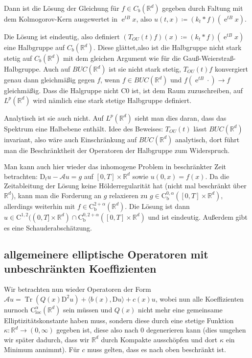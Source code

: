 \documentclass[11pt,a4paper]{scrartcl}
\newcommand{\R}{\mathbb{R}} %
\newcommand{\A}{\mathcal{A}}
\newcommand{\Cb}{\mathrm{C}_\mathrm{b}}
\theoremstyle{plain}
\theoremstyle{definition}
\theoremstyle{remark}
\DeclareMathOperator{\Tr}{Tr}
\DeclareMathOperator{\e}{e}
\begin{document}
Dann ist die Lösung der Gleichung für $f\in C_b(\R^d)$ gegeben durch Faltung mit dem Kolmogorov-Kern ausgewertet in $\e^{tB}x$, also $u(t,x)\coloneqq (k_t\ast f)(\e^{tB}x)$.

Die Lösung ist eindeutig, also definiert $(T_{OU}(t)f)(x)\coloneqq (k_t\ast f)(\e^{tB}x)$ eine Halbgruppe auf $C_b(\R^d)$. Diese glättet,also ist die Halbgruppe nicht stark stetig auf $C_b(\R^d)$ mit dem gleichen Argument wie für die Gauß-Weierstraß-Halbgruppe. Auch auf $BUC(\R^d)$ ist sie nicht stark stetig, $T_{OU}(t)f$ konvergiert genau dann gleichmäßig gegen $f$, wenn $f\in BUC(\R^d)$ und $f(\e^{tB}\cdot)\to f$ gleichmäßig. Dass die Halgruppe nicht C0 ist, ist dem Raum zuzuschreiben, auf $L^p(\R^d)$ wird nämlich eine stark stetige Halbgruppe definiert.

Analytisch ist sie auch nicht. Auf $L^p(\R^d)$ sieht man dies daran, dass das Spektrum eine Halbebene enthält. Idee des Beweises: $T_{OU}(t)$ lässt $BUC(\R^d)$ invariant, also wäre auch Einschränkung auf $BUC(\R^d)$ analytisch, dort führt man die Beschränktheit der Operatoren der Halbgruppe zum Widerspruch.

Man kann auch hier wieder das inhomogene Problem in beschränkter Zeit betrachten: $\mathrm{D}_t u -\A u = g$ auf $[0,T]\times \R^d$ sowie $u(0,x)=f(x)$. Da die Zeitableitung der Lösung keine Hölderregularität hat (nicht mal beschränkt über $\R^d$), kann man die Forderung an $g$ relaxieren zu $g\in \Cb^{0,\alpha}([0,T]\times \R^d)$, allerdings weiterhin mit $f\in \Cb^{2+\alpha}(\R^d)$. Die Lösung ist dann $u\in \mathrm{C}^{1,2}((0,T]\times \R^d)\cap \Cb^{0,2+\alpha}([0,T]\times \R^d)$ und ist eindeutig. Außerdem gibt es eine Schauderabschätzung. 

\subsection{allgemeinere elliptische Operatoren mit unbeschränkten Koeffizienten}

Wir betrachten nun wieder Operatoren der Form $\A u = \Tr(Q(x)\mathrm{D}^2u)+\langle b(x), \mathrm{D}u\rangle + c(x)u$, wobei nun alle Koeffizienten nurnoch $\mathrm{C}_\mathrm{loc}^\alpha(\R^d)$ sein müssen und $Q(x)$ nicht mehr eine gemeinsame Elliptizitätskonstante haben muss, sondern diese durch eine stetige Funktion $\kappa: \R^d\to (0,\infty)$ gegeben ist, diese also nach $0$ degenerieren kann (dies umgehen wir später dadurch, dass wir $\R^d$ durch Kompakte ausschöpfen und dort $\kappa$ ein Minimum annimmt). Für $c$ muss gelten, dass es nach oben beschränkt ist. 
\end{document}
